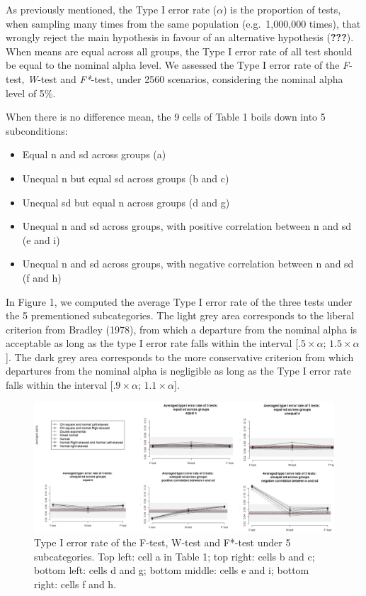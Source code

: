 \documentclass[man,floatsintext]{apa6}
\providecommand{\tightlist}{%
  \setlength{\itemsep}{0pt}\setlength{\parskip}{0pt}}
\begin{document}
As previously mentioned, the Type I error rate (\(\alpha\)) is the
proportion of tests, when sampling many times from the same population
(e.g.~1,000,000 times), that wrongly reject the main hypothesis in
favour of an alternative hypothesis ({\textbf{???}}). When means are
equal across all groups, the Type I error rate of all test should be
equal to the nominal alpha level. We assessed the Type I error rate of
the \emph{F}-test, \emph{W}-test and \emph{F*}-test, under 2560
scenarios, considering the nominal alpha level of 5\%.

When there is no difference mean, the 9 cells of Table 1 boils down into
5 subconditions:

\begin{itemize}
\tightlist
\item
  Equal n and sd across groups (a)\\
\item
  Unequal n but equal sd across groups (b and c)\\
\item
  Unequal sd but equal n across groups (d and g)\\
\item
  Unequal n and sd across groups, with positive correlation between n
  and sd (e and i)\\
\item
  Unequal n and sd across groups, with negative correlation between n
  and sd (f and h)
\end{itemize}

In Figure 1, we computed the average Type I error rate of the three
tests under the 5 prementioned subcategories. The light grey area
corresponds to the liberal criterion from Bradley (1978), from which a
departure from the nominal alpha is acceptable as long as the type I
error rate falls within the interval {[}\(.5 \times \alpha\);
\(1.5 \times \alpha\){]}. The dark grey area corresponds to the more
conservative criterion from which departures from the nominal alpha is
negligible as long as the Type I error rate falls within the interval
{[}\(.9 \times \alpha\); \(1.1 \times \alpha\){]}.

\begin{figure}
\includegraphics[width=1\linewidth]{Rmarkdown folder/Rmarkdown inputs/Fig 1_after revision} \caption{Type I error rate of the F-test, W-test and F*-test under 5 subcategories. Top left: cell a in Table 1; top right: cells b and c; bottom left: cells d and g; bottom middle: cells e and i; bottom right: cells f and h. }\label{fig:unnamed-chunk-1}
\end{figure}
\end{document}
